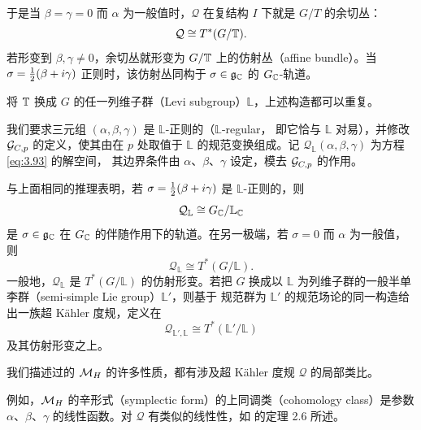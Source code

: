 于是当 $\beta=\gamma=0$ 而 $\alpha$ 为一般值时，${\mathcal Q}$ 在复结构 $I$ 下就是
$G/T$ 的余切丛：
\setcounter{equation}{95}
\begin{equation}\label{eq:3.96}
  {\mathcal Q}\cong T^*(G/{\mathbb{T}}).
\end{equation}
若形变到 $\beta,\gamma\not=0$，余切丛就形变为 $G/{\mathbb{T}}$ 上的仿射丛（affine bundle）。当
$\sigma=\frac{1}{2}(\beta+i\gamma)$ 正则时，该仿射丛同构于 $\sigma\in\mathfrak g_{\mathbb{C}}$ 的
$G_{\mathbb{C}}$-轨道。

\bigskip{}

将 ${\mathbb{T}}$ 换成 $G$ 的任一列维子群（Levi subgroup）$\mathbb{L}$，上述构造都可以重复。

我们要求三元组 $(\alpha,\beta,\gamma)$ 是 $\mathbb{L}$-正则的（$\mathbb{L}$-regular，
即它恰与 $\mathbb{L}$ 对易），并修改 $\mathcal{G}_{C,p}$ 的定义，使其由在 $p$ 处取值于
$\mathbb{L}$ 的规范变换组成。记 ${\mathcal Q}_\mathbb{L}(\alpha,\beta,\gamma)$ 为方程 \eqref{eq:3.93} 的解空间，
其边界条件由 $\alpha$、$\beta$、$\gamma$ 设定，模去 $\mathcal{G}_{C,p}$ 的作用。

与上面相同的推理表明，若 $\sigma=\frac{1}{2}(\beta+i\gamma)$ 是 $\mathbb{L}$-正则的，则
\setcounter{equation}{96}
\begin{equation}\label{eq:3.97}
  {\mathcal Q}_\mathbb{L}\cong G_{\mathbb{C}}/\mathbb{L}_{\mathbb{C}}
\end{equation}
是 $\sigma\in\mathfrak g_{\mathbb{C}}$ 在 $G_{\mathbb{C}}$ 的伴随作用下的轨道。在另一极端，若 $\sigma=0$
而 $\alpha$ 为一般值，则
\setcounter{equation}{97}
\begin{equation}\label{eq:3.98}
  {\mathcal Q}_\mathbb{L}\cong T^*(G/\mathbb{L}).
\end{equation}
一般地，${\mathcal Q}_\mathbb{L}$ 是 $T^*(G/\mathbb{L})$ 的仿射形变。若把 $G$ 换成以
$\mathbb{L}$ 为列维子群的一般半单李群（semi-simple Lie group）$\mathbb{L}'$，则基于
规范群为 $\mathbb{L}'$ 的规范场论的同一构造给出一族超 Kähler 度规，定义在
\setcounter{equation}{98}
\begin{equation}\label{eq:3.99}
  {\mathcal Q}_{\mathbb{L}',\mathbb{L}}\cong T^*(\mathbb{L}'/\mathbb{L})
\end{equation}
及其仿射形变之上。

\bigskip{}

我们描述过的 ${{\mathcal{M}}_H}$ 的许多性质，都有涉及超 Kähler 度规 ${\mathcal Q}$ 的局部类比。

例如，${{\mathcal{M}}_H}$ 的辛形式（symplectic form）的上同调类（cohomology class）是参数
$\alpha$、$\beta$、$\gamma$ 的线性函数。对 ${\mathcal Q}$ 有类似的线性性，如
\cite{ref34} 的定理 2.6 所述。

